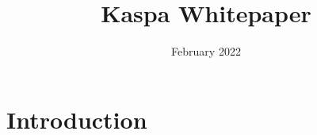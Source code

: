 \documentclass{article}
\title{Kaspa Whitepaper}
\author{ }
\date{February 2022}
\begin{document}
\maketitle

\section{Introduction}
\end{document}
